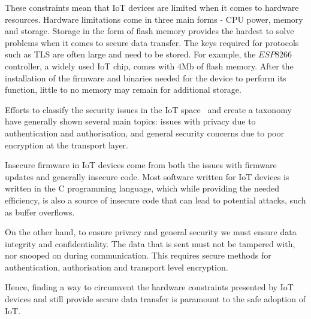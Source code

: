 These constraints mean that IoT devices are limited when it comes to hardware resources.
Hardware limitations come in three main forms - CPU power, memory and storage.
Storage in the form of flash memory provides the hardest to solve problems when it comes to secure data transfer.
The keys required for protocols such as TLS are often large and need to be stored.
For example, the $ESP8266$ controller, a widely used IoT chip, comes with $4$Mb of flash memory.
After the installation of the firmware and binaries needed for the device to perform its function, little to no memory may remain for additional storage.

Efforts to classify the security issues in the IoT space~\citep{alaba_internet_2017,gupta_security_2021,swamy_security_2017} and create a taxonomy have generally shown several main topics: issues with privacy due to authentication and authorisation, and general security concerns due to poor encryption at the transport layer.

Insecure firmware in IoT devices come from both the issues with firmware updates and generally insecure code.
Most software written for IoT devices is written in the C programming language, which while providing the needed efficiency, is also a source of insecure code that can lead to potential attacks, such as buffer overflows.

On the other hand, to ensure privacy and general security we must ensure data integrity and confidentiality.
The data that is sent must not be tampered with, nor snooped on during communication.
This requires secure methods for authentication, authorisation and transport level encryption.

Hence, finding a way to circumvent the hardware constraints presented by IoT devices and still provide secure data transfer is paramount to the safe adoption of IoT.